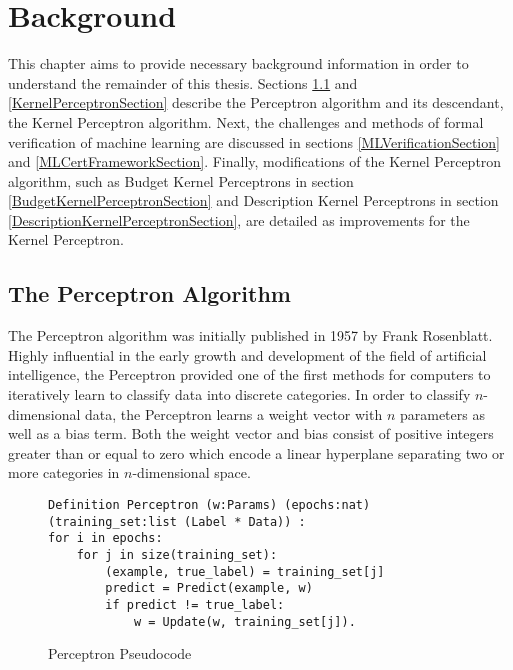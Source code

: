 \chapter{Background}\label{BackgroundChapter}
This chapter aims to provide necessary background information in order to understand the remainder of this thesis. Sections \ref{PerceptronSection} and \ref{KernelPerceptronSection} describe the Perceptron algorithm and its descendant, the Kernel Perceptron algorithm. Next, the challenges and methods of formal verification of machine learning are discussed in sections \ref{MLVerificationSection} and \ref{MLCertFrameworkSection}. Finally, modifications of the Kernel Perceptron algorithm, such as Budget Kernel Perceptrons in section \ref{BudgetKernelPerceptronSection} and Description Kernel Perceptrons in section \ref{DescriptionKernelPerceptronSection}, are detailed as improvements for the Kernel Perceptron.
\section{The Perceptron Algorithm}\label{PerceptronSection}
The Perceptron algorithm was initially published in 1957 by Frank Rosenblatt. Highly influential in the early growth and development of the field of artificial intelligence, the Perceptron \cite{Ros57} provided one of the first methods for computers to iteratively learn to classify data into discrete categories. In order to classify $n$-dimensional data, the Perceptron learns a weight vector with $n$ parameters as well as a bias term. Both the weight vector and bias consist of positive integers greater than or equal to zero which encode a linear hyperplane separating two or more categories in $n$-dimensional space.

\begin{figure}
    \caption{Perceptron Pseudocode}
    \label{PerceptronPseudo}
    \begin{lstlisting}
Definition Perceptron (w:Params) (epochs:nat) (training_set:list (Label * Data)) :
for i in epochs:
    for j in size(training_set):
        (example, true_label) = training_set[j]
        predict = Predict(example, w)
        if predict != true_label:
            w = Update(w, training_set[j]).
    \end{lstlisting}
\end{figure}

